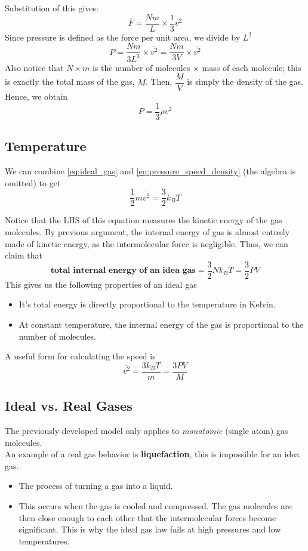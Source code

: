 \documentclass[a4paper,12pt]{article}
\newcommand{\lb}{\\[8pt]}
\begin{document}
Substitution of this gives:
$$\overline{F} = \frac{Nm}{L}\times\frac{1}{3}\overline{v^2}$$
Since pressure is defined as the force per unit area, we divide by $L^2$
$$P = \frac{Nm}{3L^3}\times\overline{v^2} = \frac{Nm}{3V}\times\overline{v^2}$$
Also notice that $N \times m$ is the number of molecules $\times$ mass of each molecule; this is exactly the total mass of the gas, $M$. Then, $\dfrac{M}{V}$ is simply the density of the gas. Hence, we obtain
\begin{equation}\label{eq:pressure_speed_density}
  P = \frac{1}{3}\rho\overline{v^2}
\end{equation}

\subsection{Temperature}

We can combine \cref{eq:ideal_gas} and \cref{eq:pressure_speed_density} (the algebra is omitted) to get
\begin{equation}\label{eq:gas_internal}
  \frac{1}{2}m\overline{v^2} = \frac{3}{2}k_BT
\end{equation}

Notice that the LHS of this equation measures the kinetic energy of the gas molecules. By previous argument, the internal energy of gas is almost entirely made of kinetic energy, as the intermolecular force is negligible. Thus, we can claim that
$$\textbf{total internal energy of an idea gas} = \frac{3}{2}Nk_BT = \frac{3}{2}{PV}$$
This gives us the following properties of an ideal gas
\begin{itemize}
  \item It's total energy is directly proportional to the temperature in Kelvin.
  \item At constant temperature, the internal energy of the gas is proportional to the number of molecules.
\end{itemize}
A useful form for calculating the speed is
$$\overline{v^2} = \frac{3k_BT}{m} = \frac{3PV}{M}$$

\pagebreak

\subsection{Ideal vs. Real Gases}

The previously developed model only applies to \textit{monatomic} (single atom) gas molecules.\lb
An example of a real gas behavior is \textbf{liquefaction}, this is impossible for an idea gas.
\begin{itemize}
  \item The process of turning a gas into a liquid.
  \item This occurs when the gas is cooled and compressed. The gas molecules are then close enough to each other that the intermolecular forces become significant. This is why the ideal gas law fails at high pressures and low temperatures.
\end{itemize}
\end{document}

